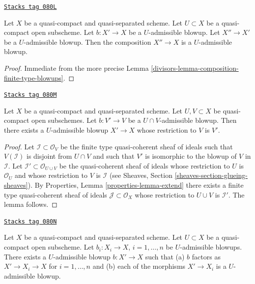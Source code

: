 \begin{lemma}
\label{divisors-lemma-composition-admissible-blowups}
\href{https://stacks.math.columbia.edu/tag/080L}{\texttt{Stacks tag 080L}}


Let $X$ be a quasi-compact and quasi-separated scheme.
Let $U \subset X$ be a quasi-compact open subscheme.
Let $b : X' \to X$ be a $U$-admissible blowup.
Let $X'' \to X'$ be a $U$-admissible blowup.
Then the composition $X'' \to X$ is a $U$-admissible blowup.
\end{lemma}

\begin{proof}

Immediate from the more precise
Lemma \ref{divisors-lemma-composition-finite-type-blowups}.
\end{proof}

\begin{lemma}
\label{divisors-lemma-extend-admissible-blowups}
\href{https://stacks.math.columbia.edu/tag/080M}{\texttt{Stacks tag 080M}}

Let $X$ be a quasi-compact and quasi-separated scheme.
Let $U, V \subset X$ be quasi-compact open subschemes.
Let $b : V' \to V$ be a $U \cap V$-admissible blowup.
Then there exists a $U$-admissible blowup $X' \to X$
whose restriction to $V$ is $V'$.
\end{lemma}

\begin{proof}
Let $\mathcal{I} \subset \mathcal{O}_V$ be the finite type
quasi-coherent sheaf of ideals such that $V(\mathcal{I})$ is
disjoint from $U \cap V$ and such that $V'$ is isomorphic to the
blowup of $V$ in $\mathcal{I}$. Let
$\mathcal{I}' \subset \mathcal{O}_{U \cup V}$ be the quasi-coherent
sheaf of ideals whose restriction to $U$ is $\mathcal{O}_U$ and
whose restriction to $V$ is $\mathcal{I}$ (see Sheaves, Section
\ref{sheaves-section-glueing-sheaves}).
By Properties, Lemma \ref{properties-lemma-extend}
there exists a finite type quasi-coherent sheaf of ideals
$\mathcal{J} \subset \mathcal{O}_X$ whose restriction to $U \cup V$ is
$\mathcal{I}'$. The lemma follows.
\end{proof}

\begin{lemma}
\label{divisors-lemma-dominate-admissible-blowups}
\href{https://stacks.math.columbia.edu/tag/080N}{\texttt{Stacks tag 080N}}

Let $X$ be a quasi-compact and quasi-separated scheme.
Let $U \subset X$ be a quasi-compact open subscheme.
Let $b_i : X_i \to X$, $i = 1, \ldots, n$ be $U$-admissible blowups.
There exists a $U$-admissible blowup $b : X' \to X$ such that
(a) $b$ factors as $X' \to X_i \to X$ for $i = 1, \ldots, n$ and
(b) each of the morphisms $X' \to X_i$ is a $U$-admissible blowup.
\end{lemma}

